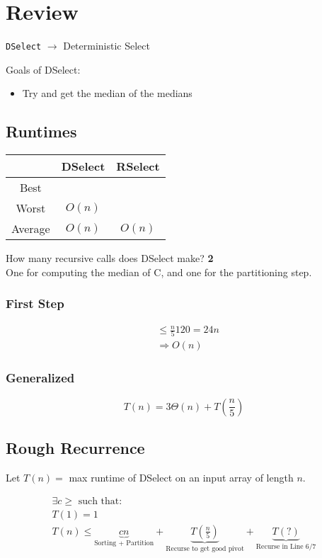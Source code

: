 \documentclass{article}
\begin{document}
\section*{Review}
\texttt{DSelect} $\rightarrow$ Deterministic Select

Goals of DSelect:
\begin{itemize}
    \item Try and get the median of the medians
\end{itemize}

\subsection*{Runtimes}
\begin{tabular}{cc|c}
            & DSelect  & RSelect  \\
    \hline
    Best    &          &          \\
    Worst   & \(O(n)\) &          \\
    Average & \(O(n)\) & \(O(n)\) \\
\end{tabular}

How many recursive calls does DSelect make? \textbf{2} \\
One for computing the median of C, and one for the partitioning step.

\subsubsection*{First Step}
\begin{align*}
     & \leq \frac{n}{5} 120 = 24n \\
     & \Rightarrow O(n)
\end{align*}

\subsubsection*{Generalized}
\begin{equation*}
    T(n) = 3 \Theta(n) + T \left( \frac{n}{5} \right)
\end{equation*}

\subsection*{Rough Recurrence}
Let \(T(n) = \) max runtime of DSelect on an input array of length $n$.

\begin{align*}
    \exists c \geq \text{ such that:} \\
    T(1) = 1                          \\
    T(n) \leq \underbrace{cn}_{\text{Sorting + Partition}} +  \underbrace{T\left( \frac{n}{5}\right)}_{\text{Recurse to get good pivot}} + \underbrace{T(?)}_{\text{Recurse in Line 6/7}}
\end{align*}
\end{document}

